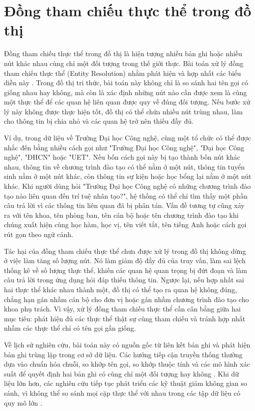 \section{Đồng tham chiếu thực thể trong đồ thị}

Đồng tham chiếu thực thể trong đồ thị là hiện tượng nhiều bản ghi hoặc nhiều nút khác nhau cùng chỉ một đối tượng trong thế giới thực. Bài toán xử lý đồng tham chiếu thực thể (Entity Resolution) nhằm phát hiện và hợp nhất các biểu diễn này \cite{christen2012data,papadakis2020entity}. Trong đồ thị tri thức, bài toán này không chỉ là so sánh hai tên gọi có giống nhau hay không, mà còn là xác định những nút nào cần được xem là cùng một thực thể để các quan hệ liên quan được quy về đúng đối tượng. Nếu bước xử lý này không được thực hiện tốt, đồ thị có thể chứa nhiều nút trùng nhau, làm cho thông tin bị chia nhỏ và các quan hệ trở nên thiếu đầy đủ.

Ví dụ, trong dữ liệu về Trường Đại học Công nghệ, cùng một tổ chức có thể được nhắc đến bằng nhiều cách gọi như "Trường Đại học Công nghệ", "Đại học Công nghệ", "ĐHCN" hoặc "UET". Nếu bốn cách gọi này bị tạo thành bốn nút khác nhau, thông tin về chương trình đào tạo có thể nằm ở một nút, thông tin tuyển sinh nằm ở một nút khác, còn thông tin sự kiện hoặc học bổng lại nằm ở một nút khác. Khi người dùng hỏi "Trường Đại học Công nghệ có những chương trình đào tạo nào liên quan đến trí tuệ nhân tạo?", hệ thống có thể chỉ tìm thấy một phần câu trả lời vì các thông tin liên quan đã bị phân tán. Vấn đề tương tự cũng xảy ra với tên khoa, tên phòng ban, tên cán bộ hoặc tên chương trình đào tạo khi chúng xuất hiện cùng học hàm, học vị, tên viết tắt, tên tiếng Anh hoặc cách gọi rút gọn theo ngữ cảnh.

Tác hại của đồng tham chiếu thực thể chưa được xử lý trong đồ thị không dừng ở việc làm tăng số lượng nút. Nó làm giảm độ đầy đủ của truy vấn, làm sai lệch thống kê về số lượng thực thể, khiến các quan hệ quan trọng bị đứt đoạn và làm câu trả lời trong ứng dụng hỏi đáp thiếu thông tin. Ngược lại, nếu hợp nhất sai hai thực thể khác nhau thành một, đồ thị có thể tạo ra quan hệ không đúng, chẳng hạn gán nhầm cán bộ cho đơn vị hoặc gán nhầm chương trình đào tạo cho khoa phụ trách. Vì vậy, xử lý đồng tham chiếu thực thể cần cân bằng giữa hai mục tiêu: phát hiện đủ các thực thể thật sự cùng tham chiếu và tránh hợp nhất nhầm các thực thể chỉ có tên gọi gần giống.

Về lịch sử nghiên cứu, bài toán này có nguồn gốc từ liên kết bản ghi và phát hiện bản ghi trùng lặp trong cơ sở dữ liệu. Các hướng tiếp cận truyền thống thường dựa vào chuẩn hóa chuỗi, so khớp tên gọi, so khớp thuộc tính và các mô hình xác suất để quyết định hai bản ghi có cùng chỉ một đối tượng hay không \cite{fellegi1969theory,christen2012data}. Khi dữ liệu lớn hơn, các nghiên cứu tiếp tục phát triển các kỹ thuật giảm không gian so sánh, vì không thể so sánh mọi cặp thực thể với nhau trong các tập dữ liệu có quy mô lớn \cite{papadakis2020entity}.

